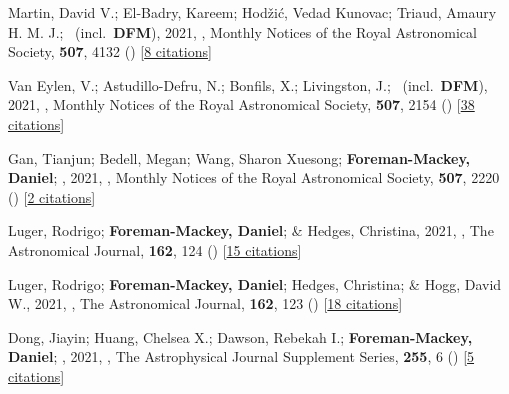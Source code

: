 \item[{\color{numcolor}\scriptsize74}] Martin, David V.; El-Badry, Kareem; Hod{\v{z}}i{\'c}, Vedad Kunovac; Triaud, Amaury H. M. J.; \etal\ (incl.\ \textbf{DFM}), 2021, , Monthly Notices of the Royal Astronomical Society, \textbf{507}, 4132 () [\href{https://ui.adsabs.harvard.edu/abs/2021MNRAS.507.4132M}{8 citations}]

\item[{\color{numcolor}\scriptsize73}] Van Eylen, V.; Astudillo-Defru, N.; Bonfils, X.; Livingston, J.; \etal\ (incl.\ \textbf{DFM}), 2021, , Monthly Notices of the Royal Astronomical Society, \textbf{507}, 2154 () [\href{https://ui.adsabs.harvard.edu/abs/2021MNRAS.507.2154V}{38 citations}]

\item[{\color{numcolor}\scriptsize72}] Gan, Tianjun; Bedell, Megan; Wang, Sharon Xuesong; \textbf{Foreman-Mackey, Daniel}; \etal, 2021, , Monthly Notices of the Royal Astronomical Society, \textbf{507}, 2220 () [\href{https://ui.adsabs.harvard.edu/abs/2021MNRAS.507.2220G}{2 citations}]

\item[{\color{numcolor}\scriptsize71}] Luger, Rodrigo; \textbf{Foreman-Mackey, Daniel}; \& Hedges, Christina, 2021, , The Astronomical Journal, \textbf{162}, 124 () [\href{https://ui.adsabs.harvard.edu/abs/2021AJ....162..124L}{15 citations}]

\item[{\color{numcolor}\scriptsize70}] Luger, Rodrigo; \textbf{Foreman-Mackey, Daniel}; Hedges, Christina; \& Hogg, David W., 2021, , The Astronomical Journal, \textbf{162}, 123 () [\href{https://ui.adsabs.harvard.edu/abs/2021AJ....162..123L}{18 citations}]

\item[{\color{numcolor}\scriptsize69}] Dong, Jiayin; Huang, Chelsea X.; Dawson, Rebekah I.; \textbf{Foreman-Mackey, Daniel}; \etal, 2021, , The Astrophysical Journal Supplement Series, \textbf{255}, 6 () [\href{https://ui.adsabs.harvard.edu/abs/2021ApJS..255....6D}{5 citations}]

